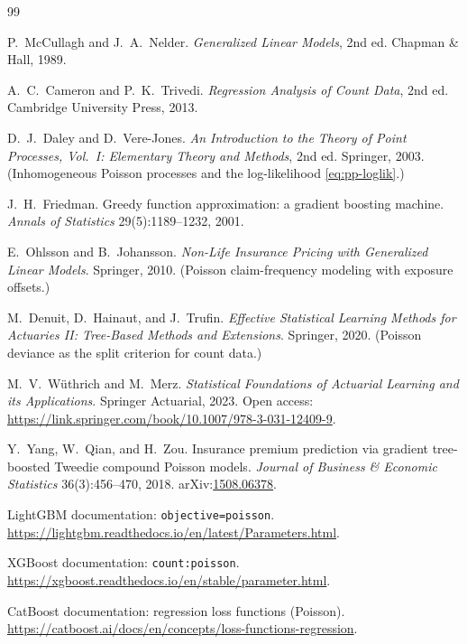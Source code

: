 \documentclass[11pt]{article}
\newcommand{\code}[1]{\texttt{\small #1}}
\begin{document}
\begin{thebibliography}{99}\small

 P.~McCullagh and J.~A.~Nelder.
\emph{Generalized Linear Models}, 2nd ed. Chapman \& Hall, 1989.

 A.~C.~Cameron and P.~K.~Trivedi.
\emph{Regression Analysis of Count Data}, 2nd ed. Cambridge University Press, 2013.

 D.~J.~Daley and D.~Vere-Jones.
\emph{An Introduction to the Theory of Point Processes, Vol.~I: Elementary Theory and
Methods}, 2nd ed. Springer, 2003. (Inhomogeneous Poisson processes and the
log-likelihood \eqref{eq:pp-loglik}.)

 J.~H.~Friedman.
Greedy function approximation: a gradient boosting machine.
\emph{Annals of Statistics} 29(5):1189--1232, 2001.

 E.~Ohlsson and B.~Johansson.
\emph{Non-Life Insurance Pricing with Generalized Linear Models}. Springer, 2010.
(Poisson claim-frequency modeling with exposure offsets.)

 M.~Denuit, D.~Hainaut, and J.~Trufin.
\emph{Effective Statistical Learning Methods for Actuaries II: Tree-Based Methods and
Extensions}. Springer, 2020. (Poisson deviance as the split criterion for count data.)

 M.~V.~W\"uthrich and M.~Merz.
\emph{Statistical Foundations of Actuarial Learning and its Applications}.
Springer Actuarial, 2023. Open access:
\url{https://link.springer.com/book/10.1007/978-3-031-12409-9}.

 Y.~Yang, W.~Qian, and H.~Zou.
Insurance premium prediction via gradient tree-boosted Tweedie compound Poisson models.
\emph{Journal of Business \& Economic Statistics} 36(3):456--470, 2018.
arXiv:\href{https://arxiv.org/abs/1508.06378}{1508.06378}.

 LightGBM documentation: \code{objective=poisson}.
\url{https://lightgbm.readthedocs.io/en/latest/Parameters.html}.

 XGBoost documentation: \code{count:poisson}.
\url{https://xgboost.readthedocs.io/en/stable/parameter.html}.

 CatBoost documentation: regression loss functions (Poisson).
\url{https://catboost.ai/docs/en/concepts/loss-functions-regression}.

\end{thebibliography}
\end{document}
